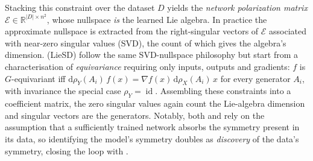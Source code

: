 \documentclass[mathematics,review,submit,moreauthors]{Definitions/mdpi}
\begin{document}
Stacking this constraint over the dataset $D$ yields the \emph{network polarization matrix} $\mathcal{E} \in \mathbb{R}^{|D| \times n^2}$, whose nullspace \emph{is} the learned Lie algebra.
In practice the approximate nullspace is extracted from the right-singular vectors of $\mathcal{E}$ associated with near-zero singular values (SVD), the count of which gives the algebra's dimension.
\citet{hu2025nn} (LieSD) follow the same SVD-nullspace philosophy but start from a characterisation of \emph{equivariance} requiring only inputs, outputs and gradients: $f$ is $G$-equivariant iff $\mathrm{d}\rho_Y(A_i)\,f(x) = \nabla f(x)\,\mathrm{d}\rho_X(A_i)\,x$ for every generator $A_i$, with invariance the special case $\rho_Y = \operatorname{id}$.
Assembling these constraints into a coefficient matrix, the zero singular values again count the Lie-algebra dimension and singular vectors are the generators.\newline
Notably, both \citet{krippendorf2020} and \citet{hu2025nn} rely on the assumption that a sufficiently trained network absorbs the symmetry present in its data, so identifying the model's symmetry doubles as \emph{discovery} of the data's symmetry, closing the loop with .
\end{document}
